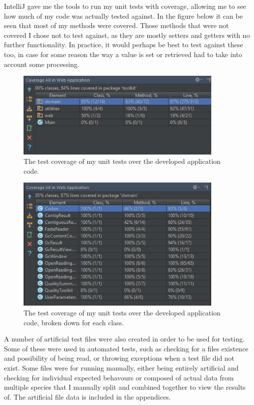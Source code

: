 IntelliJ gave  me the tools to run my unit tests with coverage, allowing me to see how much of my code was actually tested against. In the figure below it can be seen that most of my methods were covered. Those methods that were not covered I chose not to test against, as they are mostly setters and getters with no further functionality. In practice, it would perhaps be best to test against these too, in case for some reason the way a value is set or retrieved had to take into account some processing.

\begin{figure}[H]
\centering
\includegraphics[width=0.9\textwidth]{images/testcoverage1}
\caption{The test coverage of my unit tests over the developed application code.}
\end{figure}

\begin{figure}[H]
\centering
\includegraphics[width=0.9\textwidth]{images/testcoverage2}
\caption{The test coverage of my unit tests over the developed application code, broken down for each class.}
\end{figure}

A number of artificial test files were also created in order to be used for testing. Some of these were used in automated tests, such as checking for a files existence and possibility of being read, or throwing exceptions when a test file did not exist. Some files were for running manually, either being entirely artificial and checking for individual expected behavours or composed of actual data from multiple species that I manually split and combined together to view the results of. The artificial file data is included in the appendices.

